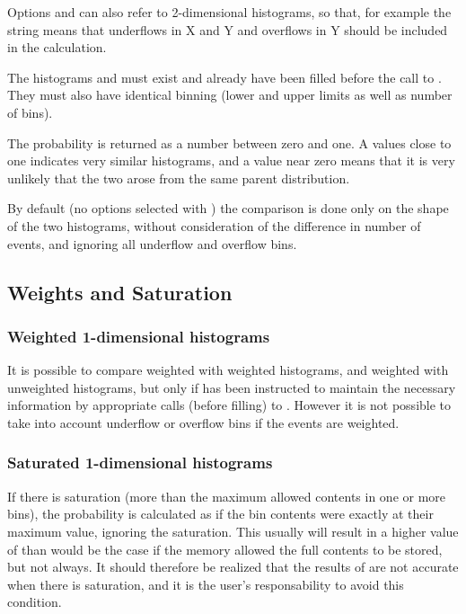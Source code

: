 \Remark
\begin{UL}
\item
Options  and  can also refer to 2-dimensional
histograms, so that, for example the string  means that
underflows in  X and Y and overflows in Y should be
included in the calculation.
\item The histograms  and  must exist and already
have been filled before the call to . They must also have
identical binning (lower and upper limits as well as number of bins).
\item The probability  is returned as a number
between zero and one.
A values close to one
indicates very similar histograms, and a value near zero
means that it is very unlikely that the two arose from the same
parent distribution.
\item By default (no options selected with )
the comparison is done only
on the shape of the two histograms, without consideration of
the difference in number of events, and ignoring all
underflow and overflow bins.
\end{UL}
 
\subsection{Weights and Saturation}
\label{HWEIGSAT}
 
\subsubsection*{Weighted 1-dimensional histograms}
 
It is possible to compare weighted with weighted histograms,
and weighted with unweighted histograms, but only
if  has been instructed to maintain the necessary
information by appropriate calls (before filling) to
.
However it is not possible to take into account underflow
or overflow bins if the events are weighted.
 
\subsubsection*{Saturated 1-dimensional histograms}
 
If there is saturation
(more than the maximum allowed contents in one or more bins),
the probability  is calculated as if the bin contents
were exactly
at their maximum value, ignoring the saturation.
This usually will result in a higher value of  than would
be the case if the memory allowed the full contents to be stored,
but not always.
It should therefore be realized that the results of  are
not accurate when there is saturation, and it is the user's
responsability to avoid this condition.
 
